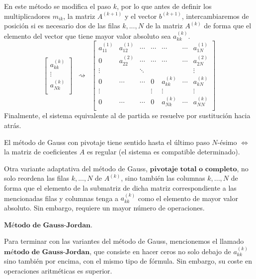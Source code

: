 \begin{nlist}
En este método se modifica el paso $k$, por lo que antes de definir los multiplicadores $m_{ik}$, la matriz $A^{(k+1)}$ y el vector $b^{(k+1)}$, intercambiaremos de posición si es necesario dos de las filas $k,...,N$ de la matriz $A^{(k)}$ de forma que el elemento del vector que tiene mayor valor absoluto sea $a_{kk}^{(k)}$.
\[
\begin{bmatrix}
a_{kk}^{(k)} \\
\vdots \\
a_{Nk}^{(k)} \\
\end{bmatrix}
\; \; \rightsquigarrow \; \;
\begin{bmatrix}
a_{11}^{(1)} & a_{12}^{(1)} & \cdots & \cdots & \cdots & \cdots & a_{1N}^{(1)} \\
0 & a_{22}^{(2)} & \cdots & \cdots & \cdots & \cdots & a_{2N}^{(2)} \\
\vdots & & \ddots & & & & \vdots \\
0 & \cdots & \cdots & 0 & a_{kk}^{(k)} & \cdots & a_{kN}^{(k)} \\
\vdots & & & \vdots & \vdots & & \vdots \\
0 & \cdots & \cdots & 0 & a_{Nk}^{(k)} & \cdots & a_{NN}^{(k)}\\
\end{bmatrix}
\]
Finalmente, el sistema equivalente al de partida se resuelve por sustitución hacia atrás.
	\begin{nota}
	El método de Gauss con pivotaje tiene sentido hasta el último paso $N$-ésimo $\Leftrightarrow$ la matriz de coeficientes $A$ es regular (el sistema es compatible determinado).
	\end{nota}
			
	\begin{nota}
	Otra variante adaptativa del método de Gauss, $\textbf{pivotaje total o completo}$, no solo
reordena las filas $k,..., N$ de $A^{(k)}$, sino también las columnas $k,..., N$ de forma
que el elemento de la submatriz de dicha matriz correspondiente a las
mencionadas filas y columnas tenga a $a_{kk}^{(k)}$ como el elemento de mayor valor absoluto. Sin embargo, requiere un mayor número de operaciones.
	\end{nota}
		
\item $\textbf{Método de Gauss-Jordan}$.

Para terminar con las variantes del método de Gauss, mencionemos el llamado $\textbf{método}$ $\textbf{de}$ $\textbf{Gauss-Jordan}$, que consiste en hacer ceros no solo debajo de $a_{kk}^{(k)}$ sino
también por encima, con el mismo tipo de fórmula. Sin embargo, su coste en operaciones aritméticas es superior.
\end{nlist}
		
